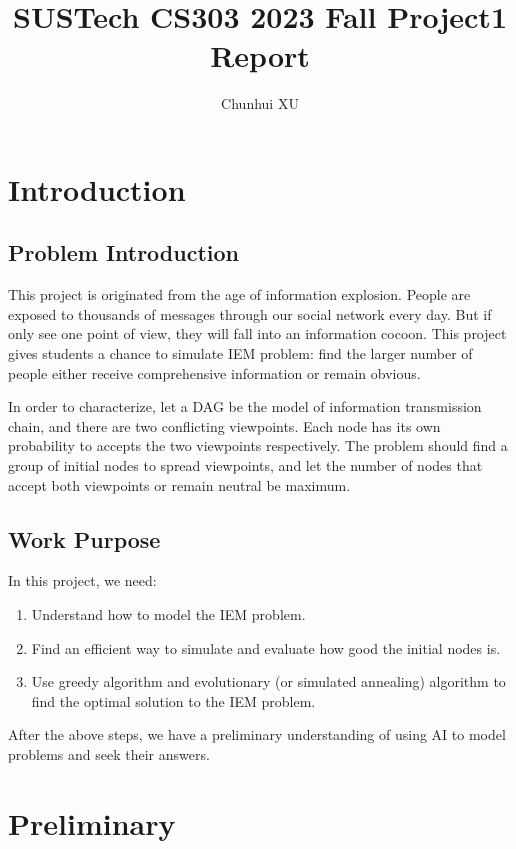 \documentclass{article}
\title{SUSTech CS303 2023 Fall Project1 Report}
\author{Chunhui XU}
\begin{document}
\maketitle

\section{Introduction}

\subsection{Problem Introduction}

This project is originated from the age of information explosion. People are exposed to thousands of messages through our social network every day. But if only see one point of view, they will fall into an information cocoon. This project gives students a chance to simulate IEM problem: find the larger number of people either receive comprehensive information or remain obvious.


In order to characterize, let a DAG be the model of information transmission chain, and there are two conflicting viewpoints. Each node has its own probability to accepts the two viewpoints respectively. The problem should find a group of initial nodes to spread viewpoints, and let the number of nodes that accept both viewpoints or remain neutral be maximum.

\subsection{Work Purpose}

In this project, we need:

\begin{enumerate}
    \item Understand how to model the IEM problem.
    \item Find an efficient way to simulate and evaluate how good the initial nodes is.
    \item Use greedy algorithm and evolutionary (or simulated annealing) algorithm to find the optimal solution to the IEM problem.
\end{enumerate}


After the above steps, we have a preliminary understanding of using AI to model problems and seek their answers.


\section{Preliminary}
\end{document}
